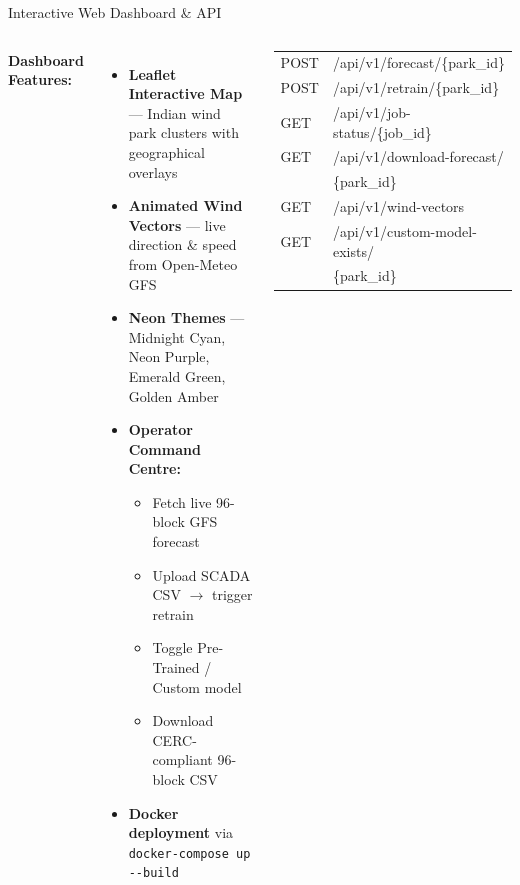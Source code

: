 \documentclass[aspectratio=169,10pt]{beamer}
\newcommand{\emphblue}[1]{{\color{WindBlue}\textbf{#1}}}
\begin{document}
\begin{frame}{Interactive Web Dashboard \& API}
  \begin{columns}[T]
      \textbf{Dashboard Features:}
      \begin{itemize}[leftmargin=1.2em, itemsep=5pt, font=\small]
        \item \faMap\; \emphblue{Leaflet Interactive Map} — Indian wind park clusters with geographical overlays
        \item \faWind\; \emphblue{Animated Wind Vectors} — live direction \& speed from Open-Meteo GFS
        \item \faPalette\; \emphblue{Neon Themes} — Midnight Cyan, Neon Purple, Emerald Green, Golden Amber
        \item \faTerminal\; \emphblue{Operator Command Centre:}
          \begin{itemize}[leftmargin=1em, itemsep=2pt, font=\small]
            \item Fetch live 96-block GFS forecast
            \item Upload SCADA CSV $\to$ trigger retrain
            \item Toggle Pre-Trained / Custom model
            \item Download CERC-compliant 96-block CSV
          \end{itemize}
        \item \faDocker\; \emphblue{Docker deployment} via \texttt{docker-compose up -{}-build}
      \end{itemize}

      \begin{tcolorbox}[statbox, title={\faPlug\; FastAPI Endpoints}]
        \ttfamily\scriptsize
        \begin{tabular}{@{}ll@{}}
          \textcolor{MLgreen}{POST} & /api/v1/forecast/\{park\_id\} \\
          \textcolor{MLgreen}{POST} & /api/v1/retrain/\{park\_id\} \\
          \textcolor{WindBlue}{GET}  & /api/v1/job-status/\{job\_id\} \\
          \textcolor{WindBlue}{GET}  & /api/v1/download-forecast/ \\
                & \quad\{park\_id\} \\
          \textcolor{WindBlue}{GET}  & /api/v1/wind-vectors \\
          \textcolor{WindBlue}{GET}  & /api/v1/custom-model-exists/ \\
                & \quad\{park\_id\} \\
        \end{tabular}
      \end{tcolorbox}


\end{columns}
\end{frame}
\end{document}
